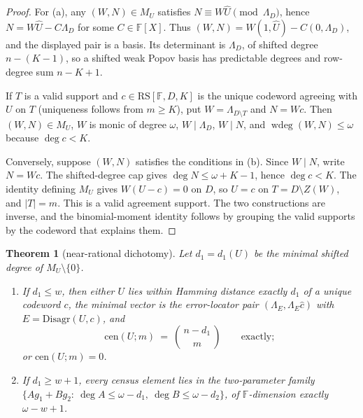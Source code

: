 \documentclass[11pt]{article}
\newtheorem{theorem}{Theorem}[section]
\theoremstyle{definition}
\theoremstyle{remark}
\newcommand{\F}{\mathbb{F}}
\newcommand{\RS}{\mathrm{RS}}
\begin{document}
\begin{proof}
For \textup{(a)}, any $(W,N)\in M_U$ satisfies
$N\equiv W\widehat U\pmod{\Lambda_D}$, hence
$N=W\widehat U-C\Lambda_D$ for some $C\in\F[X]$.  Thus
$(W,N)=W(1,\widehat U)-C(0,\Lambda_D)$, and the displayed pair is a basis.
Its determinant is $\Lambda_D$, of shifted degree $n-(K-1)$, so a shifted weak
Popov basis has predictable degrees and row-degree sum $n-K+1$.

If $T$ is a valid support and $c\in\RS[\F,D,K]$ is the unique codeword agreeing
with $U$ on $T$ \textup{(uniqueness follows from $m\ge K$)}, put
$W=\Lambda_{D\setminus T}$ and $N=Wc$.  Then $(W,N)\in M_U$, $W$ is monic of
degree $\omega$, $W\mid\Lambda_D$, $W\mid N$, and
$\operatorname{wdeg}(W,N)\le\omega$ because $\deg c<K$.

Conversely, suppose $(W,N)$ satisfies the conditions in \textup{(b)}.  Since
$W\mid N$, write $N=Wc$.  The shifted-degree cap gives
$\deg N\le\omega+K-1$, hence $\deg c<K$.  The identity defining $M_U$ gives
$W(U-c)=0$ on $D$, so $U=c$ on $T=D\setminus Z(W)$, and $|T|=m$.  This is a
valid agreement support.  The two constructions are inverse, and the
binomial-moment identity follows by grouping the valid supports by the
codeword that explains them.
\end{proof}


\begin{theorem}[near-rational dichotomy]\label{thm:capfp-dichotomy}
Let $d_1=d_1(U)$ be the minimal shifted degree of $M_U\setminus\{0\}$.
\begin{enumerate}[label=\textup{(\roman*)}]
\item If $d_1\le w$, then either $U$ lies within Hamming distance exactly $d_1$ of a \emph{unique} codeword $c$, the minimal vector is the error-locator pair $(\Lambda_E,\Lambda_E\hat c)$ with $E=\mathrm{Disagr}(U,c)$, and
\[
        \mathrm{cen}(U;m)\ =\ \binom{\,n-d_1\,}{m}\qquad\text{exactly};
\]
or $\mathrm{cen}(U;m)=0$.
\item If $d_1\ge w+1$, every census element lies in the two-parameter family $\{Ag_1+Bg_2:\ \deg A\le\omega-d_1,\ \deg B\le\omega-d_2\}$, of $\F$-dimension exactly $\omega-w+1$.
\end{enumerate}
\end{theorem}
\end{document}
